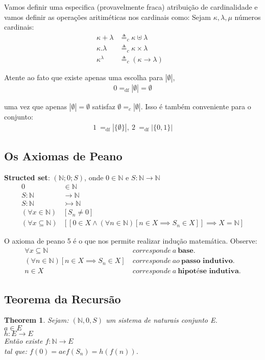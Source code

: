 \documentclass[12pt, a4paper]{article}
\newtheorem*{theorem}{Theorem}
\begin{document}
Vamos definir uma especifica (provavelmente fraca) atribuição de cardinalidade e vamos definir as operações aritiméticas nos cardinais como:
Sejam $\kappa, \lambda, \mu$ números cardinais:
\begin{align*}
\kappa + \lambda &\triangleq_c \kappa \uplus \lambda & \\
\kappa . \lambda &\triangleq_c \kappa \times \lambda & \\
\kappa^\lambda &\triangleq_c (\kappa \to \lambda) &
\end{align*}

Atente ao fato que existe apenas uma escolha para $|\emptyset|$,
\begin{align*}
0 =_\text{df} |\emptyset| = \emptyset
\end{align*}

uma vez que apenas $|\emptyset| = \emptyset$ satisfaz $\emptyset =_c |\emptyset|$. Isso é também conveniente para o conjunto:
\begin{align*}
1 ~=_\text{df} |\{\emptyset\}|, ~2 ~=_\text{df} |\{0,1\}|
\end{align*} 

\subsection{Os Axiomas de Peano}
\textbf{Structed set}: $(\mathbb{N}; 0; S)$, onde $0 \in \mathbb{N}$ e $S:\mathbb{N} \rightarrow \mathbb{N}$
\begin{align*}
0 &\in \mathbb{N}\\
S: \mathbb{N} &\rightarrow \mathbb{N}\\
S: \mathbb{N} &\rightarrowtail \mathbb{N}\\
(\forall x \in \mathbb{N})&[S_n \neq 0 ]\\
(\forall x \subseteq \mathbb{N})&[ [0 \in X \land (\forall n \in \mathbb{N}) [n \in X \implies S_n \in X ]] \implies X = \mathbb{N}]
\end{align*}

O axioma de peano 5 é o que nos permite realizar indução matemática. Observe:
\begin{align*}
\forall x \subseteq \mathbb{N}~&corresponde~a~\textbf{base}.\\
(\forall n \in \mathbb{N}) [n \in X \implies S_n \in X] ~&corresponde~ao~\textbf{passo indutivo}.\\
n \in X ~&corresponde~a~\textbf{hipotése indutiva}.
\end{align*}

\subsection{Teorema da Recursão}
\label{sec:recursion}
\begin{theorem}
Sejam: $(\mathbb{N}, 0, S)$ um sistema de naturais conjunto E.\\
$a \in E$\\
$h:E \rightarrow E$\\
Então existe $f: \mathbb{N} \rightarrow E$\\
tal que: $f(0) = a e f(S_n) = h(f(n))$.
\end{theorem}
\end{document}
